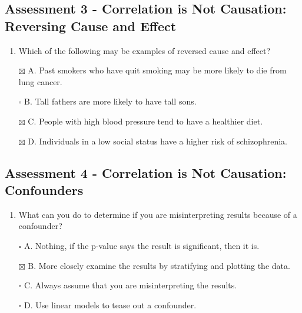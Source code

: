 \documentclass[
]{article}
\providecommand{\tightlist}{%
  \setlength{\itemsep}{0pt}\setlength{\parskip}{0pt}}
\begin{document}
\hypertarget{assessment-3---correlation-is-not-causation-reversing-cause-and-effect}{%
\subsection{Assessment 3 - Correlation is Not Causation: Reversing Cause
and
Effect}\label{assessment-3---correlation-is-not-causation-reversing-cause-and-effect}}

\begin{enumerate}
\def\labelenumi{\arabic{enumi}.}
\tightlist
\item
  Which of the following may be examples of reversed cause and effect?
\end{enumerate}

\begin{itemize}
\tightlist
\item[$\boxtimes$]
  A. Past smokers who have quit smoking may be more likely to die from
  lung cancer.
\item[$\square$]
  B. Tall fathers are more likely to have tall sons.
\item[$\boxtimes$]
  C. People with high blood pressure tend to have a healthier diet.
\item[$\boxtimes$]
  D. Individuals in a low social status have a higher risk of
  schizophrenia.
\end{itemize}

\hypertarget{assessment-4---correlation-is-not-causation-confounders}{%
\subsection{Assessment 4 - Correlation is Not Causation:
Confounders}\label{assessment-4---correlation-is-not-causation-confounders}}

\begin{enumerate}
\def\labelenumi{\arabic{enumi}.}
\tightlist
\item
  What can you do to determine if you are misinterpreting results
  because of a confounder?
\end{enumerate}

\begin{itemize}
\tightlist
\item[$\square$]
  A. Nothing, if the p-value says the result is significant, then it is.
\item[$\boxtimes$]
  B. More closely examine the results by stratifying and plotting the
  data.
\item[$\square$]
  C. Always assume that you are misinterpreting the results.
\item[$\square$]
  D. Use linear models to tease out a confounder.
\end{itemize}
\end{document}
